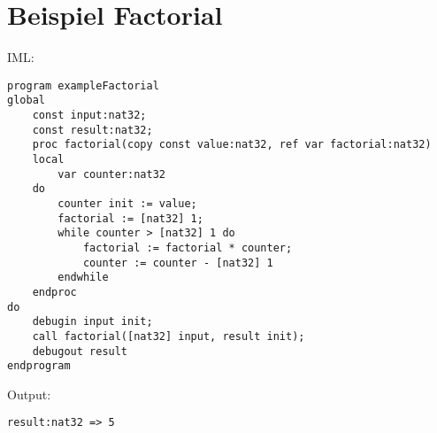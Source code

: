 \documentclass[10pt, a4paper, twocolumn]{article} %
\begin{document}
\clearpage
\section{Beispiel Factorial}
IML:
\begin{lstlisting}
program exampleFactorial
global
    const input:nat32;
    const result:nat32;
    proc factorial(copy const value:nat32, ref var factorial:nat32)
    local
        var counter:nat32
    do
        counter init := value;
        factorial := [nat32] 1;
        while counter > [nat32] 1 do
            factorial := factorial * counter;
            counter := counter - [nat32] 1
        endwhile
    endproc
do
    debugin input init;
    call factorial([nat32] input, result init);
    debugout result
endprogram
\end{lstlisting}

Output:

\texttt{result:nat32 => 5} \cmark
\end{document}
